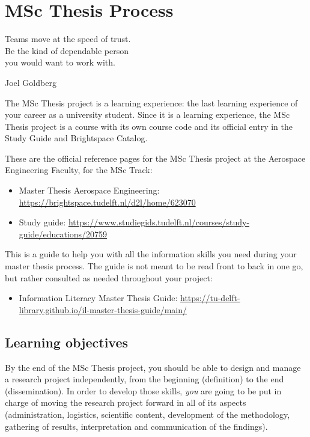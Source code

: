 \chapter{MSc Thesis Process}
\label{ch:msc-thesis-process}
%
\epigraph{
	Teams move at the speed of trust. \\
    Be the kind of dependable person \\
    you would want to work with.
}{Joel Goldberg}


The MSc Thesis project is a learning experience: the last learning experience of your career as a university student. 
Since it is a learning experience, the MSc Thesis project is a course with its own course code and its official entry in the Study Guide and Brightspace Catalog.


These are the official reference pages for the MSc Thesis project at the Aerospace Engineering Faculty, for the  MSc Track:
\begin{itemize}
    \item Master Thesis Aerospace Engineering: \url{https://brightspace.tudelft.nl/d2l/home/623070}
    \item Study guide: \url{https://www.studiegids.tudelft.nl/courses/study-guide/educations/20759}
\end{itemize}

This is a guide to help you with all the information skills you need during your master thesis process.
The guide is not meant to be read front to back in one go, but rather consulted as needed throughout your project:
\begin{itemize}
    \item Information Literacy Master Thesis Guide: \url{https://tu-delft-library.github.io/il-master-thesis-guide/main/}
\end{itemize}


\section{Learning objectives}

By the end of the MSc Thesis project, you should be able to design and manage a research project independently, from the beginning (definition) to the end (dissemination). 
In order to develop those skills, \emph{you} are going to be put in charge of moving the research project forward in all of its aspects (administration, logistics, scientific content, development of the methodology, gathering of results, interpretation and communication of the findings).


